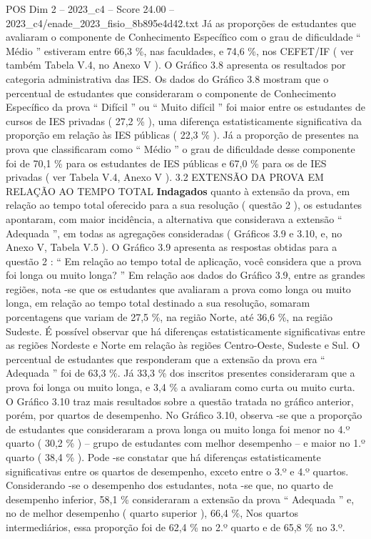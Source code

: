 \begin{textsample}{POS Dim 2 – 2023\_c4 – Score 24.00 – 2023\_c4/enade\_2023\_fisio\_8b895e4d42.txt}
Já as proporções de estudantes que avaliaram o componente de Conhecimento Específico com o grau de dificuldade “ Médio ” estiveram entre 66,3 \%, nas faculdades, e 74,6 \%, nos CEFET/IF ( ver também Tabela V.4, no Anexo V ).
O Gráfico 3.8 apresenta os resultados por categoria administrativa das IES.
Os dados do Gráfico 3.8 mostram que o percentual de estudantes que consideraram o componente de Conhecimento Específico da prova “ Difícil ” ou “ Muito difícil ” foi maior entre os estudantes de cursos de IES privadas ( 27,2 \% ), uma diferença estatisticamente significativa da proporção em relação às IES públicas ( 22,3 \% ).
Já a proporção de presentes na prova que classificaram como “ Médio ” o grau de dificuldade desse componente foi de 70,1 \% para os estudantes de IES públicas e 67,0 \% para os de IES privadas ( ver Tabela V.4, Anexo V ). 3.2 EXTENSÃO DA PROVA EM RELAÇÃO AO TEMPO TOTAL \textbf{Indagados} quanto à extensão da prova, em relação ao tempo total oferecido para a sua resolução ( questão 2 ), os estudantes apontaram, com maior incidência, a alternativa que considerava a extensão “ Adequada ”, em todas as agregações consideradas ( Gráficos 3.9 e 3.10, e, no Anexo V, Tabela V.5 ).
O Gráfico 3.9 apresenta as respostas obtidas para a questão 2 : “ Em relação ao tempo total de aplicação, você considera que a prova foi longa ou muito longa? ” Em relação aos dados do Gráfico 3.9, entre as grandes regiões, nota -se que os estudantes que avaliaram a prova como longa ou muito longa, em relação ao tempo total destinado a sua resolução, somaram porcentagens que variam de 27,5 \%, na região Norte, até 36,6 \%, na região Sudeste.
É possível observar que há diferenças estatisticamente significativas entre as regiões Nordeste e Norte em relação às regiões Centro-Oeste, Sudeste e Sul.
O percentual de estudantes que responderam que a extensão da prova era “ Adequada ” foi de 63,3 \%.
Já 33,3 \% dos inscritos presentes consideraram que a prova foi longa ou muito longa, e 3,4 \% a avaliaram como curta ou muito curta.
O Gráfico 3.10 traz mais resultados sobre a questão tratada no gráfico anterior, porém, por quartos de desempenho.
No Gráfico 3.10, observa -se que a proporção de estudantes que consideraram a prova longa ou muito longa foi menor no 4.º quarto ( 30,2 \% ) – grupo de estudantes com melhor desempenho – e maior no 1.º quarto ( 38,4 \% ).
Pode -se constatar que há diferenças estatisticamente significativas entre os quartos de desempenho, exceto entre o 3.º e 4.º quartos.
Considerando -se o desempenho dos estudantes, nota -se que, no quarto de desempenho inferior, 58,1 \% consideraram a extensão da prova “ Adequada ” e, no de melhor desempenho ( quarto superior ), 66,4 \%, Nos quartos intermediários, essa proporção foi de 62,4 \% no 2.º quarto e de 65,8 \% no 3.º.

\end{textsample}
